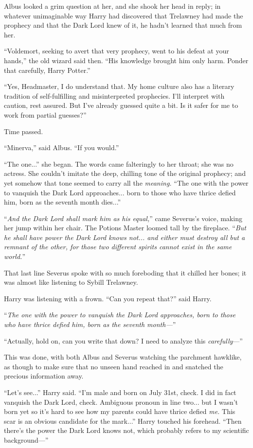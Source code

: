 Albus looked a grim question at her, and she shook her head in reply; in whatever unimaginable way Harry had discovered that Trelawney had made the prophecy and that the Dark Lord knew of it, he hadn’t learned that much from her.

“Voldemort, seeking to avert that very prophecy, went to his defeat at your hands,” the old wizard said then. “His knowledge brought him only harm. Ponder that carefully, Harry Potter.”

“Yes, Headmaster, I do understand that. My home culture also has a literary tradition of self-fulfilling and misinterpreted prophecies. I’ll interpret with caution, rest assured. But I’ve already guessed quite a bit. Is it safer for me to work from partial guesses?”

Time passed.

“Minerva,” said Albus. “If you would.”

“The one...” she began. The words came falteringly to her throat; she was no actress. She couldn’t imitate the deep, chilling tone of the original prophecy; and yet somehow that tone seemed to carry all the \emph{meaning.} “The one with the power to vanquish the Dark Lord approaches... born to those who have thrice defied him, born as the seventh month dies...”

“\emph{And the Dark Lord shall mark him as his equal,}” came Severus’s voice, making her jump within her chair. The Potions Master loomed tall by the fireplace. “\emph{But he shall have power the Dark Lord knows not... and either must destroy all but a remnant of the other, for those two different spirits cannot exist in the same world.}”

That last line Severus spoke with so much foreboding that it chilled her bones; it was almost like listening to Sybill Trelawney.

Harry was listening with a frown. “Can you repeat that?” said Harry.

“\emph{The one with the power to vanquish the Dark Lord approaches, born to those who have thrice defied him, born as the seventh month—}”

“Actually, hold on, can you write that down? I need to analyze this \emph{carefully}—”

This was done, with both Albus and Severus watching the parchment hawklike, as though to make sure that no unseen hand reached in and snatched the precious information away.

“Let’s see...” Harry said. “I’m male and born on July 31st, check. I did in fact vanquish the Dark Lord, check. Ambiguous pronoun in line two... but I wasn’t born yet so it’s hard to see how my parents could have thrice defied \emph{me.} This scar is an obvious candidate for the mark...” Harry touched his forehead. “Then there’s the power the Dark Lord knows not, which probably refers to my scientific background—”

